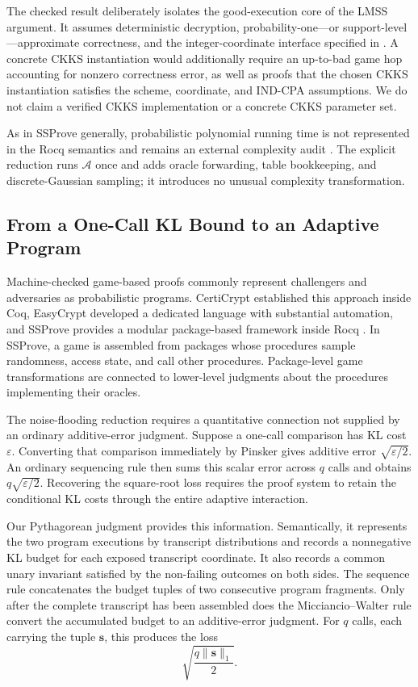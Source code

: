 The checked result deliberately isolates the good-execution core of the LMSS argument. It assumes deterministic decryption, probability-one---or support-level---approximate correctness, and the integer-coordinate interface specified in . A concrete CKKS instantiation would additionally require an up-to-bad game hop accounting for nonzero correctness error, as well as proofs that the chosen CKKS instantiation satisfies the scheme, coordinate, and IND-CPA assumptions. We do not claim a verified CKKS implementation or a concrete CKKS parameter set.

As in SSProve generally, probabilistic polynomial running time is not represented in the Rocq semantics and remains an external complexity audit \cite{ssprove}. The explicit reduction runs $\mathcal{A}$ once and adds oracle forwarding, table bookkeeping, and discrete-Gaussian sampling; it introduces no unusual complexity transformation.

\subsection{From a One-Call KL Bound to an Adaptive Program}
\label{sec:intro-local-to-adaptive}

Machine-checked game-based proofs commonly represent challengers and adversaries as probabilistic programs. CertiCrypt established this approach inside Coq, EasyCrypt developed a dedicated language with substantial automation, and SSProve provides a modular package-based framework inside Rocq \cite{certicrypt,easycrypt,ssprove}. In SSProve, a game is assembled from packages whose procedures sample randomness, access state, and call other procedures. Package-level game transformations are connected to lower-level judgments about the procedures implementing their oracles.

The noise-flooding reduction requires a quantitative connection not supplied by an ordinary additive-error judgment. Suppose a one-call comparison has KL cost $\varepsilon$. Converting that comparison immediately by Pinsker gives additive error $\sqrt{\varepsilon/2}$. An ordinary sequencing rule then sums this scalar error across $q$ calls and obtains $q\sqrt{\varepsilon/2}$. Recovering the square-root loss requires the proof system to retain the conditional KL costs through the entire adaptive interaction.

Our Pythagorean judgment provides this information. Semantically, it represents the two program executions by transcript distributions and records a nonnegative KL budget for each exposed transcript coordinate. It also records a common unary invariant satisfied by the non-failing outcomes on both sides. The sequence rule concatenates the budget tuples of two consecutive program fragments. Only after the complete transcript has been assembled does the Micciancio--Walter rule convert the accumulated budget to an additive-error judgment. For $q$ calls, each carrying the tuple $\mathbf{s}$, this produces the loss
\[
\sqrt{\frac{q\lVert\mathbf{s}\rVert_{1}}{2}}.
\]

